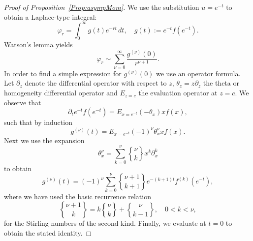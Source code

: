 \documentclass[10pt,a4paper]{amsart}
\begin{document}
\begin{proof}
[Proof of Proposition~\ref{Prop:asympMom}]We use the substitution $u=e^{-t}$
to obtain a Laplace-type integral:
\[
\varphi_{r}=\int_{0}^{\infty}g(t)e^{-rt}\,dt,\quad g(t):=e^{-t}f(e^{-t}).
\]
Watson's lemma yields
\[
\varphi_{r}\sim\sum_{\nu=0}^{\infty}\frac{g^{(\nu)}(0)}{r^{\nu+1}}.
\]
In order to find a simple expression for $g^{(\nu)}(0)$ we use an operator
formula. Let $\partial_{z}$ denote the differential operator with respect to
$z$, $\theta_{z}=z\partial_{z}$ the theta or homogeneity differential operator
and $E_{z=c}$ the evaluation operator at $z=c$. We observe that
\[
\partial_{t}e^{-t}f(e^{-t})=E_{x=e^{-t}}(-\theta_{x})xf(x),
\]
such that by induction
\[
g^{(\nu)}(t)=E_{x=e^{-t}}(-1)^{\nu}\theta_{x}^{\nu}xf(x).
\]
Next we use the expansion
\[
\theta_{x}^{\nu}=\sum_{k=0}^{\nu}%
\genfrac{\{}{\}}{0pt}{}{\nu}{k}%
x^{k}\partial_{x}^{k}%
\]
to obtain
\[
g^{(\nu)}(t)=(-1)^{\nu}\sum_{k=0}^{\nu}%
\genfrac{\{}{\}}{0pt}{}{\nu+1}{k+1}%
e^{-(k+1)t}f^{(k)}(e^{-t}),
\]
where we have used the basic recurrence relation
\[%
\genfrac{\{}{\}}{0pt}{}{\nu+1}{k}%
=k%
\genfrac{\{}{\}}{0pt}{}{\nu}{k}%
+%
\genfrac{\{}{\}}{0pt}{}{\nu}{k-1}%
,\quad0<k<\nu,
\]
for the Stirling numbers of the second kind. Finally, we evaluate at $t=0$ to
obtain the stated identity.
\end{proof}
\end{document}
